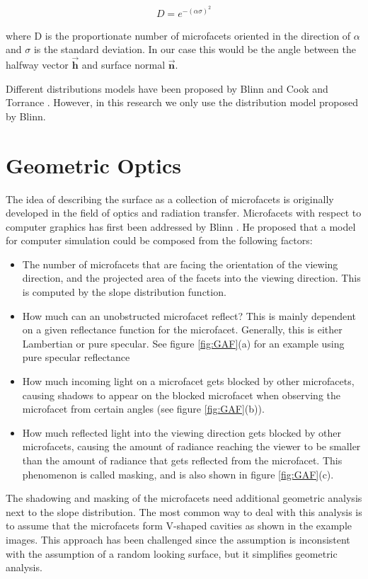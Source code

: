 	\begin{eqnarray*}
		D = e^{-(\alpha \sigma)^2}
	\end{eqnarray*}

\noindent where D is the proportionate number of microfacets oriented in the direction of $\alpha$ and $\sigma$ is the standard deviation. In our case this would be the angle between the halfway vector $\vec{\mathbf{h}}$ and surface normal $\vec{\mathbf{n}}$.

Different distributions models have been proposed by Blinn \cite{Blinn} and Cook and Torrance \cite{DigitalModeling}. However, in this research we only use the distribution model proposed by Blinn.

\section{Geometric Optics}
The idea of describing the surface as a collection of microfacets is originally developed in the field of optics and radiation transfer. Microfacets with respect to computer graphics has first been addressed by Blinn \cite{Blinn}. He proposed that a model for computer simulation could be composed from the following factors:

\begin{itemize}
	\item{ The number of microfacets that are facing the orientation of the viewing direction, and the projected area of the facets into the viewing direction. This is computed by the slope distribution function. }
	\item{ How much can an unobstructed microfacet reflect? This is mainly dependent on a given reflectance function for the microfacet. Generally, this is  either Lambertian or pure specular. See figure \ref{fig:GAF}(a) for an example using pure specular reflectance}
	\item{ How much incoming light on a microfacet gets blocked by other microfacets, causing shadows to appear on the blocked microfacet when observing the microfacet from certain angles (see figure \ref{fig:GAF}(b)).} 
	\item{ How much reflected light into the viewing direction gets blocked by other microfacets, causing the amount of radiance reaching the viewer to be smaller than the amount of radiance that gets reflected from the microfacet. This phenomenon is called masking, and is also shown in figure \ref{fig:GAF}(c). }
\end{itemize}

The shadowing and masking of the microfacets need additional geometric analysis next to the slope distribution. The most common way to deal with this analysis is to assume that the microfacets form V-shaped cavities as shown in the example images. This approach has been challenged since the assumption is inconsistent with the assumption of a random looking surface, but it simplifies geometric analysis.

